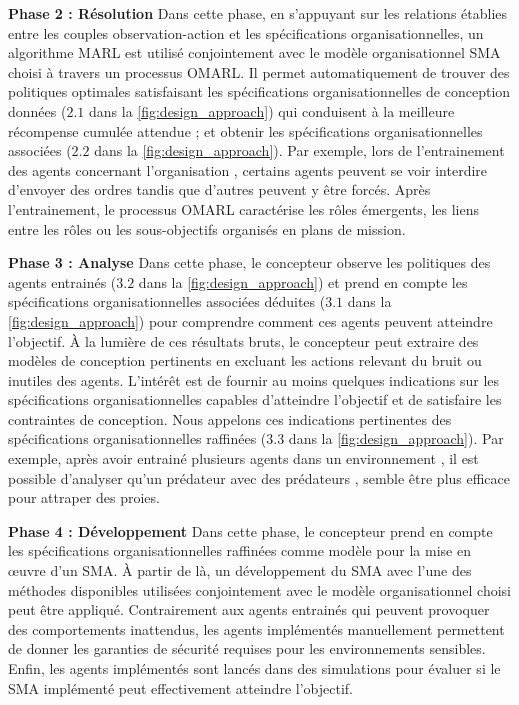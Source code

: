 \textbf{Phase 2 : Résolution} \quad Dans cette phase, en s'appuyant sur les relations établies entre les couples observation-action et les spécifications organisationnelles, un algorithme MARL est utilisé conjointement avec le modèle organisationnel SMA choisi à travers un processus OMARL. Il permet automatiquement de trouver des politiques optimales satisfaisant les spécifications organisationnelles de conception données ($2.1$ dans la \autoref{fig:design_approach}) qui conduisent à la meilleure récompense cumulée attendue ; et obtenir les spécifications organisationnelles associées ($2.2$ dans la \autoref{fig:design_approach}). Par exemple, lors de l'entrainement des agents concernant l'organisation , certains agents peuvent se voir interdire d'envoyer des ordres tandis que d'autres peuvent y être forcés. Après l'entrainement, le processus OMARL caractérise les rôles émergents, les liens entre les rôles ou les sous-objectifs organisés en plans de mission.

\textbf{Phase 3 : Analyse} \quad Dans cette phase, le concepteur observe les politiques des agents entrainés ($3.2$ dans la \autoref{fig:design_approach}) et prend en compte les spécifications organisationnelles associées déduites ($3.1$ dans la \autoref{fig:design_approach}) pour comprendre comment ces agents peuvent atteindre l'objectif. À la lumière de ces résultats bruts, le concepteur peut extraire des modèles de conception pertinents en excluant les actions relevant du bruit ou inutiles des agents. L'intérêt est de fournir au moins quelques indications sur les spécifications organisationnelles capables d'atteindre l'objectif et de satisfaire les contraintes de conception. Nous appelons ces indications pertinentes des spécifications organisationnelles raffinées ($3.3$ dans la \autoref{fig:design_approach}). Par exemple, après avoir entrainé plusieurs agents dans un environnement , il est possible d'analyser qu'un prédateur  avec des prédateurs , semble être plus efficace pour attraper des proies.

\textbf{Phase 4 : Développement} \quad Dans cette phase, le concepteur prend en compte les spécifications organisationnelles raffinées comme modèle pour la mise en œuvre d'un SMA. À partir de là, un développement du SMA avec l'une des méthodes disponibles utilisées conjointement avec le modèle organisationnel choisi peut être appliqué. Contrairement aux agents entrainés qui peuvent provoquer des comportements inattendus, les agents implémentés manuellement permettent de donner les garanties de sécurité requises pour les environnements sensibles. Enfin, les agents implémentés sont lancés dans des simulations pour évaluer si le SMA implémenté peut effectivement atteindre l'objectif.

